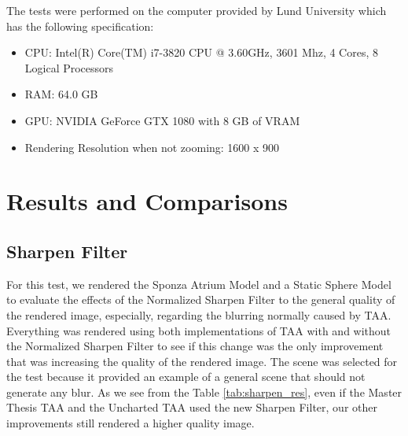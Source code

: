 \documentclass{cslthse-msc}
\begin{document}
The tests were performed on the computer provided by Lund University which has the following specification:
\begin{itemize}
\setlength\itemsep{0em}
\item CPU: Intel(R) Core(TM) i7-3820 CPU @ 3.60GHz, 3601 Mhz, 4 Cores, 8 Logical Processors
\item RAM: 64.0 GB	
\item GPU: NVIDIA GeForce GTX 1080 with 8 GB of VRAM
\item Rendering Resolution when not zooming: 1600 x 900
\end{itemize}

\section{Results and Comparisons}

\subsection{Sharpen Filter}
For this test, we rendered the Sponza Atrium Model and a Static Sphere Model to evaluate the effects of the Normalized Sharpen Filter to the general quality of the rendered image, especially, regarding the blurring normally caused by TAA. Everything was rendered using both implementations of TAA with and without the Normalized Sharpen Filter to see if this change was the only improvement that was increasing the quality of the rendered image. The scene was selected for the test because it provided an example of a general scene that should not generate any blur. As we see from the Table \ref{tab:sharpen_res}, even if the Master Thesis TAA and the Uncharted TAA used the new Sharpen Filter, our other improvements still rendered a higher quality image.
\end{document}
